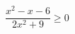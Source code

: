 \begin{ex}[type=inequality]
	\begin{condition}
		\( \dfrac{x^2-x-6}{2x^2+9}\ge0 \)
	\end{condition}
\end{ex}